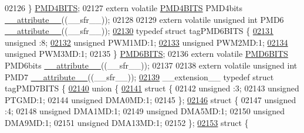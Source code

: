 \begin{DoxyCode}
02126 \} \hyperlink{a00008_d9/d0f/a00644}{PMD4BITS};
02127 \textcolor{keyword}{extern} \textcolor{keyword}{volatile} \hyperlink{a00008_d9/d0f/a00644}{PMD4BITS} PMD4bits \hyperlink{a00009_a493c46f03454991ccc5aa7a6e1dfb2a7}{\_\_attribute\_\_}((\_\_sfr\_\_));
02128 
02129 \textcolor{keyword}{extern} \textcolor{keyword}{volatile} \textcolor{keywordtype}{unsigned} \textcolor{keywordtype}{int}  PMD6 \hyperlink{a00009_a493c46f03454991ccc5aa7a6e1dfb2a7}{\_\_attribute\_\_}((\_\_sfr\_\_));
\hypertarget{a00009_source_l02130}{}\hyperlink{a00008}{02130} \textcolor{keyword}{typedef} \textcolor{keyword}{struct }tagPMD6BITS \{
\hypertarget{a00009_source_l02131}{}\hyperlink{a00008_adf71f3d8410c1f1dbbc96680a92c49af}{02131}   \textcolor{keywordtype}{unsigned} :8;
\hypertarget{a00009_source_l02132}{}\hyperlink{a00008_ae3db28ac501d2a3bb7250a95e88933ec}{02132}   \textcolor{keywordtype}{unsigned} PWM1MD:1;
\hypertarget{a00009_source_l02133}{}\hyperlink{a00008_abc1282116bc7aa439b2516a747060404}{02133}   \textcolor{keywordtype}{unsigned} PWM2MD:1;
\hypertarget{a00009_source_l02134}{}\hyperlink{a00008_a3365bf3675c5b06b0eaa0d64a2a58fe2}{02134}   \textcolor{keywordtype}{unsigned} PWM3MD:1;
02135 \} \hyperlink{a00008_d6/dcf/a00645}{PMD6BITS};
02136 \textcolor{keyword}{extern} \textcolor{keyword}{volatile} \hyperlink{a00008_d6/dcf/a00645}{PMD6BITS} PMD6bits \hyperlink{a00009_a493c46f03454991ccc5aa7a6e1dfb2a7}{\_\_attribute\_\_}((\_\_sfr\_\_));
02137 
02138 \textcolor{keyword}{extern} \textcolor{keyword}{volatile} \textcolor{keywordtype}{unsigned} \textcolor{keywordtype}{int}  PMD7 \hyperlink{a00009_a493c46f03454991ccc5aa7a6e1dfb2a7}{\_\_attribute\_\_}((\_\_sfr\_\_));
\hypertarget{a00009_source_l02139}{}\hyperlink{a00008}{02139} \_\_extension\_\_ \textcolor{keyword}{typedef} \textcolor{keyword}{struct }tagPMD7BITS \{
\hypertarget{a00009_source_l02140}{}\hyperlink{a00009}{02140}   \textcolor{keyword}{union }\{
\hypertarget{a00009_source_l02141}{}\hyperlink{a00009}{02141}     \textcolor{keyword}{struct }\{
02142       \textcolor{keywordtype}{unsigned} :3;
02143       \textcolor{keywordtype}{unsigned} PTGMD:1;
02144       \textcolor{keywordtype}{unsigned} DMA0MD:1;
02145     \};
\hypertarget{a00009_source_l02146}{}\hyperlink{a00009}{02146}     \textcolor{keyword}{struct }\{
02147       \textcolor{keywordtype}{unsigned} :4;
02148       \textcolor{keywordtype}{unsigned} DMA1MD:1;
02149       \textcolor{keywordtype}{unsigned} DMA5MD:1;
02150       \textcolor{keywordtype}{unsigned} DMA9MD:1;
02151       \textcolor{keywordtype}{unsigned} DMA13MD:1;
02152     \};
\hypertarget{a00009_source_l02153}{}\hyperlink{a00009}{02153}     \textcolor{keyword}{struct }\{

\end{DoxyCode}
